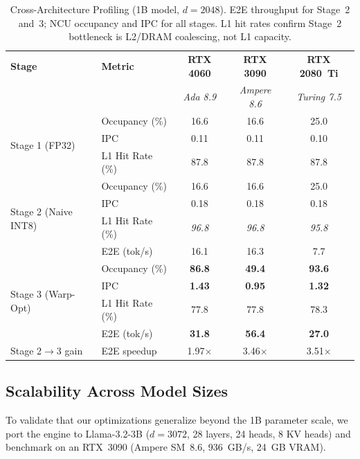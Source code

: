 \documentclass[conference]{IEEEtran}
\begin{document}
\begin{table}[htbp]
\centering
\caption{Cross-Architecture Profiling (1B model, $d=2048$). E2E throughput for Stage~2 and~3; NCU occupancy and IPC for all stages. L1 hit rates confirm Stage~2 bottleneck is L2/DRAM coalescing, not L1 capacity.}
\label{tab:cross_arch}
\setlength{\tabcolsep}{2pt}
\scriptsize
\begin{tabular}{llccc}
\toprule
\textbf{Stage} & \textbf{Metric} & \textbf{RTX 4060} & \textbf{RTX 3090} & \textbf{RTX 2080~Ti} \\
 & & \textit{Ada 8.9} & \textit{Ampere 8.6} & \textit{Turing 7.5} \\
\midrule
\multirow{3}{*}{Stage 1 (FP32)} & Occupancy (\%) & 16.6 & 16.6 & 25.0 \\
 & IPC & 0.11 & 0.11 & 0.10 \\
 & L1 Hit Rate (\%) & 87.8 & 87.8 & 87.8 \\
\midrule
\multirow{4}{*}{Stage 2 (Naive INT8)} & Occupancy (\%) & 16.6 & 16.6 & 25.0 \\
 & IPC & 0.18 & 0.18 & 0.18 \\
 & L1 Hit Rate (\%) & \textit{96.8} & \textit{96.8} & \textit{95.8} \\
 & E2E (tok/s) & 16.1 & 16.3 & 7.7 \\
\midrule
\multirow{4}{*}{Stage 3 (Warp-Opt)} & Occupancy (\%) & \textbf{86.8} & \textbf{49.4} & \textbf{93.6} \\
 & IPC & \textbf{1.43} & \textbf{0.95} & \textbf{1.32} \\
 & L1 Hit Rate (\%) & 77.8 & 77.8 & 78.3 \\
 & E2E (tok/s) & \textbf{31.8} & \textbf{56.4} & \textbf{27.0} \\
\midrule
\multirow{1}{*}{Stage 2$\to$3 gain} & E2E speedup & 1.97$\times$ & 3.46$\times$ & 3.51$\times$ \\
\bottomrule
\end{tabular}
\end{table}

\subsection{Scalability Across Model Sizes}
\label{sec:3b}

To validate that our optimizations generalize beyond the 1B parameter scale, we port the engine to Llama-3.2-3B ($d=3072$, 28 layers, 24 heads, 8 KV heads) and benchmark on an RTX~3090 (Ampere SM~8.6, 936~GB/s, 24~GB VRAM).
\end{document}
